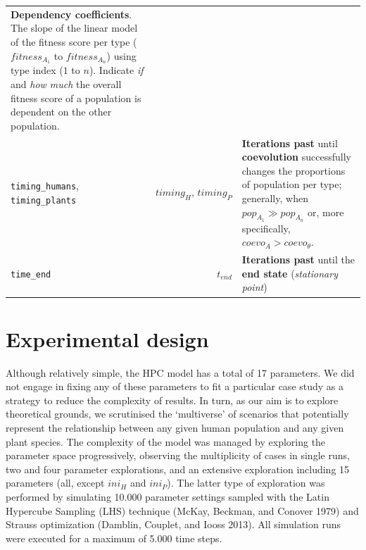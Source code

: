 \documentclass[
]{book}
\begin{document}
\begin{longtable}[]{@{}lrl@{}}
\begin{minipage}[t]{0.34\columnwidth}
\textbf{Dependency coefficients}. The slope of the linear model of the fitness score per type (\(fitness_{A_1}\) to \(fitness_{A_n}\)) using type index (\(1\) to \(n\)). Indicate \emph{if} and \emph{how much} the overall fitness score of a population is dependent on the other population.\strut
\end{minipage}\tabularnewline
\begin{minipage}[t]{0.36\columnwidth}\raggedright
\texttt{timing\_humans}, \texttt{timing\_plants}\strut
\end{minipage} & \begin{minipage}[t]{0.22\columnwidth}\raggedleft
\(timing_{H},\,timing_{P}\)\strut
\end{minipage} & \begin{minipage}[t]{0.34\columnwidth}\raggedright
\textbf{Iterations past} until \textbf{coevolution} successfully changes the proportions of population per type; generally, when \(pop_{A_1}\gg pop_{A_n}\) or, more specifically, \(coevo_A>coevo_{\theta}\).\strut
\end{minipage}\tabularnewline
\begin{minipage}[t]{0.36\columnwidth}\raggedright
\texttt{time\_end}\strut
\end{minipage} & \begin{minipage}[t]{0.22\columnwidth}\raggedleft
\(t_{end}\)\strut
\end{minipage} & \begin{minipage}[t]{0.34\columnwidth}\raggedright
\textbf{Iterations past} until the \textbf{end state} (\emph{stationary point})\strut
\end{minipage}\tabularnewline
\bottomrule
\end{longtable}

\newpage

\hypertarget{experimental-design}{%
\section*{Experimental design}\label{experimental-design}}

Although relatively simple, the HPC model has a total of 17 parameters. We did not engage in fixing any of these parameters to fit a particular case study as a strategy to reduce the complexity of results. In turn, as our aim is to explore theoretical grounds, we scrutinised the `multiverse' of scenarios that potentially represent the relationship between any given human population and any given plant species. The complexity of the model was managed by exploring the parameter space progressively, observing the multiplicity of cases in single runs, two and four parameter explorations, and an extensive exploration including 15 parameters (all, except \(ini_H\) and \(ini_P\)). The latter type of exploration was performed by simulating 10.000 parameter settings sampled with the Latin Hypercube Sampling (LHS) technique (McKay, Beckman, and Conover 1979) and Strauss optimization (Damblin, Couplet, and Iooss 2013). All simulation runs were executed for a maximum of 5.000 time steps.
\end{document}
